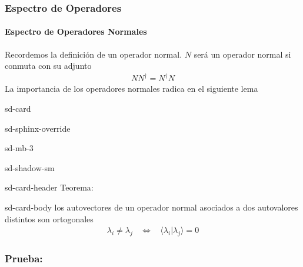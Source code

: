 \documentclass[letterpaper,10pt,english]{jupyterBook}
\newcommand{\braket}[2]{\langle #1|#2\rangle}
\begin{document}
\sphinxAtStartPar



\subsubsection{Espectro de Operadores}
\label{\detokenize{docs/Part_01_Formalismo/Chapter_01_02_Formalismo_matem_xe1tico/01_03_Operadores_myst:espectro-de-operadores}}

\paragraph{Espectro de Operadores Normales}
\label{\detokenize{docs/Part_01_Formalismo/Chapter_01_02_Formalismo_matem_xe1tico/01_03_Operadores_myst:espectro-de-operadores-normales}}
\sphinxAtStartPar
Recordemos la definición de un operador normal. \(N\) será un operador normal si conmuta con su adjunto
\begin{equation*}
\begin{split}
NN^\dagger = N^\dagger N
\end{split}
\end{equation*}
\sphinxAtStartPar
La importancia de los operadores normales radica en el siguiente lema

\begin{sphinxuseclass}{sd-card}
\begin{sphinxuseclass}{sd-sphinx-override}
\begin{sphinxuseclass}{sd-mb-3}
\begin{sphinxuseclass}{sd-shadow-sm}
\begin{sphinxuseclass}{sd-card-header}
\sphinxAtStartPar
Teorema:

\end{sphinxuseclass}
\begin{sphinxuseclass}{sd-card-body}
\sphinxAtStartPar
los autovectores de un operador normal asociados a dos autovalores distintos  son ortogonales
\begin{equation*}
\begin{split}
\lambda_i\neq \lambda_j~~~~\Longleftrightarrow ~~~~ \braket{\lambda_i}{\lambda_j} = 0
\end{split}
\end{equation*}
\end{sphinxuseclass}
\end{sphinxuseclass}
\end{sphinxuseclass}
\end{sphinxuseclass}
\end{sphinxuseclass}\subsubsection*{Prueba:}
\end{document}
